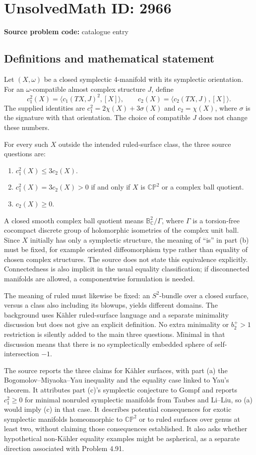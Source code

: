 \documentclass[11pt]{article}
\newcommand{\C}{\mathbb{C}}
\begin{document}
\section*{UnsolvedMath ID: 2966}
\textbf{Source problem code:} catalogue entry
\subsection{Definitions and mathematical statement}
Let \((X,\omega)\) be a closed symplectic 4-manifold with its symplectic orientation. For an \(\omega\)-compatible almost complex structure \(J\), define
\[
c_1^2(X)=\langle c_1(TX,J)^2,[X]\rangle,\qquad
c_2(X)=\langle c_2(TX,J),[X]\rangle.
\]
The supplied identities are \(c_1^2=2\chi(X)+3\sigma(X)\) and \(c_2=\chi(X)\), where \(\sigma\) is the signature with that orientation. The choice of compatible \(J\) does not change these numbers.

For every such \(X\) outside the intended ruled-surface class, the three source questions are:
\begin{enumerate}
\item \(c_1^2(X)\leq3c_2(X)\).
\item \(c_1^2(X)=3c_2(X)>0\) if and only if \(X\) is \(\mathbb{CP}^2\) or a complex ball quotient.
\item \(c_2(X)\geq0\).
\end{enumerate}
A closed smooth complex ball quotient means \(\mathbb B^2_\C/\Gamma\), where \(\Gamma\) is a torsion-free cocompact discrete group of holomorphic isometries of the complex unit ball. Since \(X\) initially has only a symplectic structure, the meaning of ``is'' in part (b) must be fixed, for example oriented diffeomorphism type rather than equality of chosen complex structures. The source does not state this equivalence explicitly. Connectedness is also implicit in the usual equality classification; if disconnected manifolds are allowed, a componentwise formulation is needed.

The meaning of ruled must likewise be fixed: an \(S^2\)-bundle over a closed surface, versus a class also including its blowups, yields different domains. The background uses K\"ahler ruled-surface language and a separate minimality discussion but does not give an explicit definition. No extra minimality or \(b_2^+>1\) restriction is silently added to the main three questions. Minimal in that discussion means that there is no symplectically embedded sphere of self-intersection \(-1\).

The source reports the three claims for K\"ahler surfaces, with part (a) the Bogomolov--Miyaoka--Yau inequality and the equality case linked to Yau's theorem. It attributes part (c)'s symplectic conjecture to Gompf and reports \(c_1^2\geq0\) for minimal nonruled symplectic manifolds from Taubes and Li--Liu, so (a) would imply (c) in that case. It describes potential consequences for exotic symplectic manifolds homeomorphic to \(\mathbb{CP}^2\) or to ruled surfaces over genus at least two, without claiming those consequences established. It also asks whether hypothetical non-K\"ahler equality examples might be aspherical, as a separate direction associated with Problem 4.91.
\end{document}
